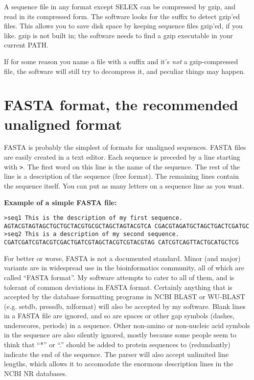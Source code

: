 A sequence file in any format except SELEX can be compressed by gzip,
and read in its compressed form. The software looks for the suffix
 to detect gzip'ed files. This allows you to save disk space
by keeping sequence files gzip'ed, if you like. gzip is not built in;
the software needs to find a gzip executable in your current PATH.

If for some reason you name a file with a  suffix and it's
\emph{not} a gzip-compressed file, the software will still try to
decompress it, and peculiar things may happen.

\section{FASTA format, the recommended unaligned format}

FASTA is probably the simplest of formats for unaligned sequences.
FASTA files are easily created in a text editor.  Each sequence is
preceded by a line starting with \verb+>+. The first word on this line
is the name of the sequence. The rest of the line is a description of
the sequence (free format). The remaining lines contain the sequence
itself. You can put as many letters on a sequence line as you want.

\textbf{Example of a simple FASTA file:}
\begin{verbatim}
>seq1 This is the description of my first sequence.
AGTACGTAGTAGCTGCTGCTACGTGCGCTAGCTAGTACGTCA CGACGTAGATGCTAGCTGACTCGATGC
>seq2 This is a description of my second sequence.
CGATCGATCGTACGTCGACTGATCGTAGCTACGTCGTACGTAG CATCGTCAGTTACTGCATGCTCG
\end{verbatim}

For better or worse, FASTA is not a documented standard. Minor (and
major) variants are in widespread use in the bioinformatics community,
all of which are called ``FASTA format''. My software attempts to
cater to all of them, and is tolerant of common deviations in FASTA
format. Certainly anything that is accepted by the database formatting
programs in NCBI BLAST or WU-BLAST (e.g. setdb, pressdb, xdformat)
will also be accepted by my software. Blank lines in a FASTA file are
ignored, and so are spaces or other gap symbols (dashes, underscores,
periods) in a sequence. Other non-amino or non-nucleic acid symbols in
the sequence are also silently ignored, mostly because some people
seem to think that ``*'' or ``.'' should be added to protein sequences
to (redundantly) indicate the end of the sequence. The parser will
also accept unlimited line lengths, which allows it to accomodate the
enormous description lines in the NCBI NR databases.

